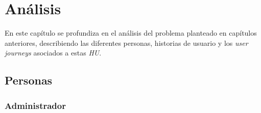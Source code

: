 \chapter{Análisis}

En este capítulo se profundiza en el análisis del problema planteado en capítulos anteriores, describiendo las diferentes personas, historias de usuario y los \textit{user journeys} asociados a estas \textit{HU}.

\section{Personas}

\subsection{Administrador}
\label{sec:personaAdmin}

